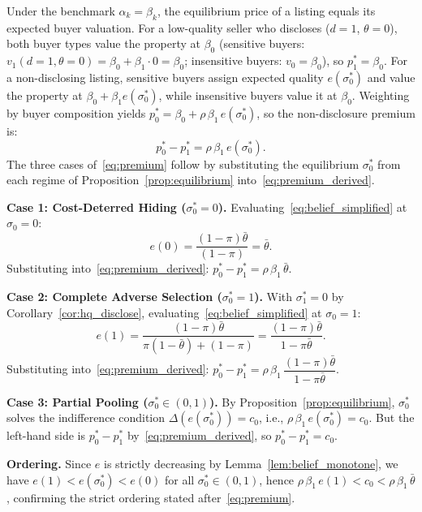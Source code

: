 Under the benchmark $\alpha_k=\beta_k$, the equilibrium price of a listing equals its expected buyer valuation. For a low-quality seller who discloses ($d=1$, $\theta=0$), both buyer types value the property at $\beta_0$ (sensitive buyers: $v_1(d=1,\theta=0)=\beta_0+\beta_1\cdot 0=\beta_0$; insensitive buyers: $v_0=\beta_0$), so $p_1^*=\beta_0$. For a non-disclosing listing, sensitive buyers assign expected quality $e(\sigma_0^*)$ and value the property at $\beta_0+\beta_1 e(\sigma_0^*)$, while insensitive buyers value it at $\beta_0$. Weighting by buyer composition yields $p_0^*=\beta_0+\rho\,\beta_1\,e(\sigma_0^*)$, so the non-disclosure premium is:
\begin{equation}
    p_0^*-p_1^* = \rho\,\beta_1\,e(\sigma_0^*). \label{eq:premium_derived}
\end{equation}
The three cases of~\eqref{eq:premium} follow by substituting the equilibrium $\sigma_0^*$ from each regime of Proposition~\ref{prop:equilibrium} into~\eqref{eq:premium_derived}.

\medskip
\textbf{Case 1: Cost-Deterred Hiding ($\sigma_0^*=0$).}
Evaluating~\eqref{eq:belief_simplified} at $\sigma_0=0$:
\[
    e(0) = \frac{(1-\pi)\bar{\theta}}{(1-\pi)} = \bar{\theta}.
\]
Substituting into~\eqref{eq:premium_derived}: $p_0^*-p_1^* = \rho\,\beta_1\,\bar{\theta}$.

\medskip
\textbf{Case 2: Complete Adverse Selection ($\sigma_0^*=1$).}
With $\sigma_1^*=0$ by Corollary~\ref{cor:hq_disclose}, evaluating~\eqref{eq:belief_simplified} at $\sigma_0=1$:
\[
    e(1) = \frac{(1-\pi)\bar{\theta}}{\pi(1-\bar{\theta})+(1-\pi)} = \frac{(1-\pi)\bar{\theta}}{1-\pi\bar{\theta}}.
\]
Substituting into~\eqref{eq:premium_derived}: $p_0^*-p_1^* = \rho\,\beta_1\,\dfrac{(1-\pi)\bar{\theta}}{1-\pi\bar{\theta}}$.

\medskip
\textbf{Case 3: Partial Pooling ($\sigma_0^*\in(0,1)$).}
By Proposition~\ref{prop:equilibrium}, $\sigma_0^*$ solves the indifference condition $\Delta(e(\sigma_0^*))=c_0$, i.e., $\rho\,\beta_1\,e(\sigma_0^*)=c_0$. But the left-hand side is $p_0^*-p_1^*$ by~\eqref{eq:premium_derived}, so $p_0^*-p_1^*=c_0$.

\medskip
\textbf{Ordering.}
Since $e$ is strictly decreasing by Lemma~\ref{lem:belief_monotone}, we have $e(1)<e(\sigma_0^*)<e(0)$ for all $\sigma_0^*\in(0,1)$, hence $\rho\,\beta_1\,e(1)<c_0<\rho\,\beta_1\,\bar{\theta}$, confirming the strict ordering stated after~\eqref{eq:premium}.
